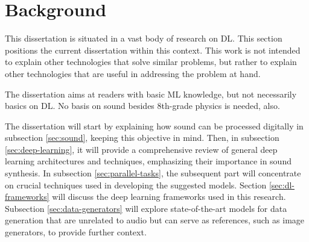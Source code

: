 \section{Background} \label{sec:background}

This dissertation is situated in a vast body of research on \ac{DL}. This section positions the current dissertation within this context. This work is not intended to explain other technologies that solve similar problems, but rather to explain other technologies that are useful in addressing the problem at hand.

The dissertation aims at readers with basic \ac{ML} knowledge, but not necessarily basics on \ac{DL}. No basis on sound besides 8th-grade physics is needed, also.

The dissertation will start by explaining how sound can be processed digitally in subsection \ref{sec:sound}, keeping this objective in mind. Then, in subsection \ref{sec:deep-learning}, it will provide a comprehensive review of general deep learning architectures and techniques, emphasizing their importance in sound synthesis. In subsection \ref{sec:parallel-tasks}, the subsequent part will concentrate on crucial techniques used in developing the suggested models. Section \ref{sec:dl-frameworks} will discuss the deep learning frameworks used in this research. Subsection \ref{sec:data-generators} will explore state-of-the-art models for data generation that are unrelated to audio but can serve as references, such as image generators, to provide further context.





